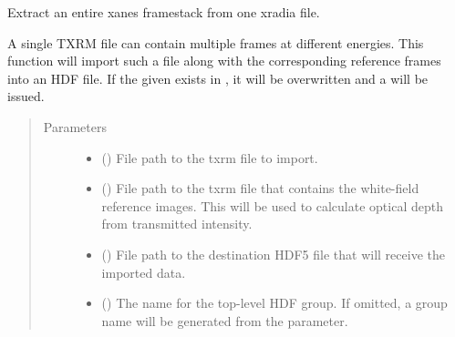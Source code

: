 \documentclass[letterpaper,10pt,english]{sphinxmanual}
\begin{document}
\begin{fulllineitems}
\label{\detokenize{xanespy:xanespy.importers.import_aps_8BM_xanes_file}}
Extract an entire xanes framestack from one xradia file.

A single TXRM file can contain multiple frames at different
energies. This function will import such a file along with the
corresponding reference frames into an HDF file. If the given
 exists in , it will be overwritten
and a  will be issued.
\begin{quote}\begin{description}
\item[{Parameters}] \leavevmode\begin{itemize}
\item {} 
 () \textendash{} File path to the txrm file to import.

\item {} 
 () \textendash{} File path to the txrm file that contains the white-field
reference images. This will be used to calculate optical depth
from transmitted intensity.

\item {} 
 () \textendash{} File path to the destination HDF5 file that will receive the
imported data.

\item {} 
 (\sphinxstyleliteralemphasis{, }) \textendash{} The name for the top-level HDF group. If omitted, a group name
will be generated from the  parameter.

\end{itemize}

\end{description}\end{quote}

\end{fulllineitems}

\end{document}
